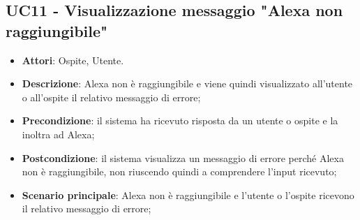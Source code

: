 \documentclass[../AnalisiDeiRequisiti_v3.0.0.tex]{subfiles}
\begin{document}
\subsection{UC11 - Visualizzazione messaggio "Alexa non raggiungibile"} 
\label{sssec:UC11} 
\begin{itemize} 
\item \textbf{Attori}: Ospite, Utente.
\item \textbf{Descrizione}: Alexa non è raggiungibile e viene quindi visualizzato all'utente o all'ospite il relativo messaggio di errore;
\item \textbf{Precondizione}: il sistema ha ricevuto risposta da un utente o ospite e la inoltra ad Alexa;
\item \textbf{Postcondizione}: il sistema visualizza un messaggio di errore perché Alexa non è raggiungibile, non riuscendo quindi a comprendere l'input ricevuto;
\item \textbf{Scenario principale}: Alexa non è raggiungibile e l'utente o l'ospite ricevono il relativo messaggio di errore;
\end{itemize} 
\end{document}
